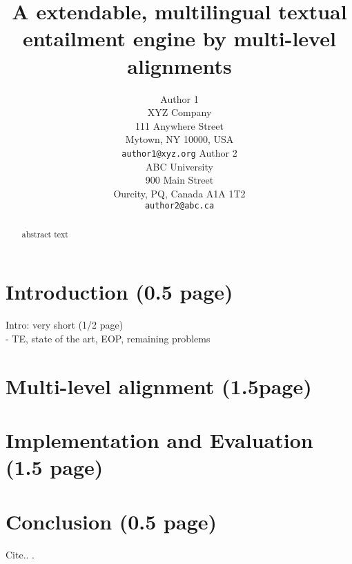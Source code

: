 \documentclass[11pt,letterpaper]{article}
\title{A extendable, multilingual textual entailment engine by multi-level alignments}
\author{Author 1\\
	    XYZ Company\\
	    111 Anywhere Street\\
	    Mytown, NY 10000, USA\\
	    {\tt author1@xyz.org}
	  \And
	Author 2\\
  	ABC University\\
  	900 Main Street\\
  	Ourcity, PQ, Canada A1A 1T2\\
  {\tt author2@abc.ca}}
\date{}
\begin{document}
\maketitle
\begin{abstract}
 abstract text 
\end{abstract}

\section{Introduction (0.5 page)}
Intro: very short (1/2 page) \\
- TE, state of the art, EOP, remaining problems \\ 

\section{Multi-level alignment (1.5page)}
 
\section{Implementation and Evaluation (1.5 page)}

\section{Conclusion (0.5 page)} 

   Cite.. \cite{Katz:1987}.




\end{document}
